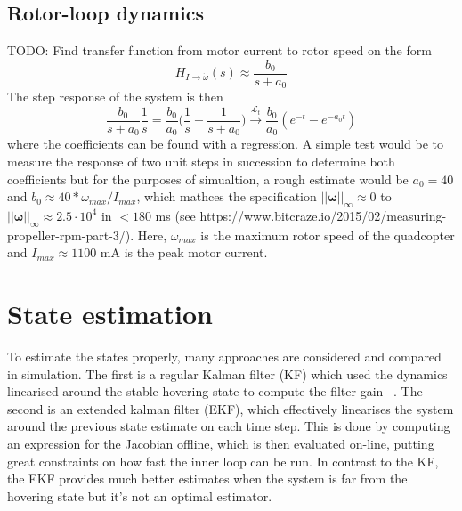 \documentclass{article}
\begin{document}
\subsection{Rotor-loop dynamics}
TODO: Find transfer function from motor current to rotor speed on the form
\begin{equation}
H_{I\rightarrow \dot{\omega}}(s) \approx \frac{b_0}{s + a_0}
\end{equation}
The step response of the system is then
\begin{equation}
\frac{b_0}{s + a_0} \frac{1}{s} = \frac{b_0}{a_0}\Big(\frac{1}{s} - \frac{1}{s + a_0}\Big) \overset{\mathcal{L}_t}{\longrightarrow}
\frac{b_0}{a_0}(e^{-t} - e^{-a_0t})
\end{equation}
where the coefficients can be found with a regression. A simple test would be to measure the response of two unit steps in succession to determine both coefficients but for the purposes of simualtion, a rough estimate would be $a_0=40$ and $b_0 \approx 40*\omega_{max}/I_{max}$, which mathces the specification $||{\boldsymbol\omega}||_{\infty} \approx 0$ to $||{\boldsymbol\omega}||_{\infty} \approx 2.5\cdot 10^4$ in $< 180$ ms (see https://www.bitcraze.io/2015/02/measuring-propeller-rpm-part-3/). Here, $\omega_{max}$ is the maximum rotor speed of the quadcopter and $I_{max}\approx 1100$ mA is the peak motor current.

\section{State estimation}
To estimate the states properly, many approaches are considered and compared in simulation. The first is a regular Kalman filter (KF) which used the dynamics linearised around the stable hovering state to compute the filter gain ~\cite{glad2000control}. The second is an extended kalman filter (EKF), which effectively linearises the system around the previous state estimate on each time step. This is done by computing an expression for the Jacobian offline, which is then evaluated on-line, putting great constraints on how fast the inner loop can be run. In contrast to the KF, the EKF provides much better estimates when the system is far from the hovering state but it's not an optimal estimator.
\end{document}
